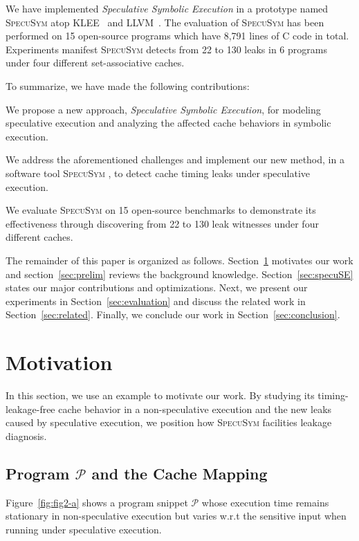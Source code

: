 \documentclass[sigconf]{acmart}
\newcommand{\SpecuSym}{\textsc{SpecuSym} }
\newcommand{\prog}{\mathcal{P}}
\begin{document}
We have implemented \textit{Speculative Symbolic Execution} in a prototype 
named \SpecuSym atop KLEE~\cite{CadarDE08} and LLVM~\cite{LattnerA04}. The 
evaluation of \SpecuSym has been performed on 15 open-source programs which 
have 8,791 lines of C code in total. Experiments manifest \SpecuSym detects
from 22 to 130 leaks in 6 programs under four different set-associative caches.

To summarize, we have made the following contributions:
\begin{compactitem}
  \item 
    We propose a new approach, \emph{Speculative Symbolic Execution}, for 
    modeling speculative execution and analyzing the affected cache behaviors 
    in symbolic execution.
  \item 
    We address the aforementioned challenges and implement our new method, 
    in a software tool \SpecuSym, to detect cache timing leaks under 
    speculative execution. 
  \item 
    We evaluate \SpecuSym on 15 open-source benchmarks to demonstrate its 
    effectiveness through discovering from 22 to 130 leak witnesses under four 
    different caches.
\end{compactitem}


The remainder of this paper is organized as follows. Section~\ref{sec:mtv} 
motivates our work and section~\ref{sec:prelim} reviews the background 
knowledge. Section~\ref{sec:specuSE} states our major contributions and
optimizations. Next, we present our experiments in Section~\ref{sec:evaluation} 
and discuss the related work in Section~\ref{sec:related}. Finally, we 
conclude our work in Section~\ref{sec:conclusion}.


\section{Motivation}
\label{sec:mtv}

In this section, we use an example to motivate our work. By studying its 
timing-leakage-free cache behavior in a non-speculative execution and the new 
leaks caused by speculative execution, we position how \SpecuSym facilities leakage
diagnosis.


\subsection{Program ${\prog}$ and the Cache Mapping}
\label{sec:leak_example}

Figure~\ref{fig:fig2-a} shows a program snippet ${\prog}$ whose execution 
time remains stationary in non-speculative execution but varies w.r.t the 
sensitive input when running under speculative execution.
\end{document}
